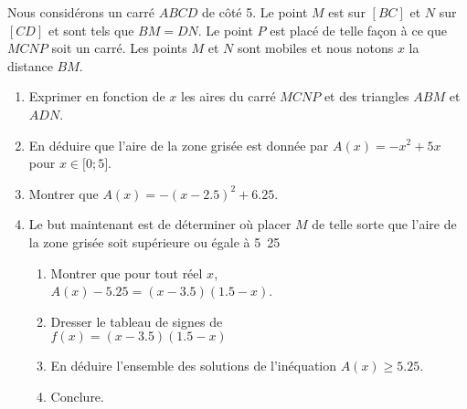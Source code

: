 
\begin{exercice}\label{exosmath-0654}

%   


    Nous considérons un carré \( ABCD\) de côté \unit{5}{\centi\meter}. Le point \( M\) est sur \( [BC]\) et \( N\) sur \( [CD]\) et sont tels que \( BM=DN\). Le point \( P\) est placé de telle façon à ce que \( MCNP\) soit un carré. Les points \( M\) et \( N\) sont mobiles et nous notons \( x\) la distance \( BM\).

    \begin{center}
   
    \end{center}

    \begin{enumerate}
        \item
            Exprimer en fonction de \( x\) les aires du carré \( MCNP\) et des triangles \( ABM\) et \( ADN\).
        \item
            En déduire que l'aire de la zone grisée est donnée par \( A(x)=-x^2+5x\) pour \( x\in\mathopen[ 0 ; 5 \mathclose]\).
        \item
            Montrer que \( A(x)=-(x-2.5)^2+6.25\).
        \item
            Le but maintenant est de déterminer où placer \( M\) de telle sorte que l'aire de la zone grisée soit supérieure ou égale à \unit{5.25}{\centi\meter\squared}
            \begin{enumerate}
                \item
                    Montrer que pour tout réel \( x\), \\ \( A(x)-5.25=(x-3.5)(1.5-x)\).
                \item
                    Dresser le tableau de signes de\\ \( f(x)=(x-3.5)(1.5-x)\)
                \item
                    En déduire l'ensemble des solutions de l'inéquation \( A(x)\geq 5.25\).
                \item
                    Conclure.
            \end{enumerate}
    \end{enumerate}

\end{exercice}

